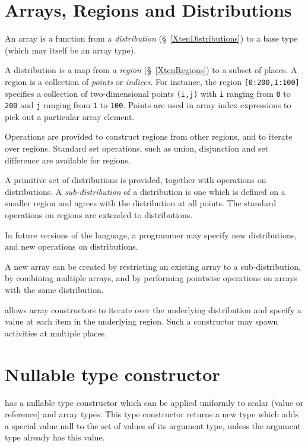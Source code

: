 \section{Arrays, Regions and Distributions}
An \Xten{} array is a function from a {\em distribution}
(\S~\ref{XtenDistributions}) to a base type (which may itself be an
array type).

A distribution is a map from a {\em region} (\S~\ref{XtenRegions}) to a
subset of places.  A region is a collection of {\em points} or
{\em indices}. For instance, the region {\tt [0:200,1:100]} specifies
a collection of two-dimensional points {\tt (i,j)} with 
{\tt i} ranging from {\tt 0} to {\tt 200} and {\tt j} ranging
from {\tt 1} to {\tt 100}. Points are used in array index expressions
to pick out a particular array element.

Operations are provided to construct regions from other regions, and
to iterate over regions. Standard set operations, such as union,
disjunction and set difference are available for regions.

A primitive set of distributions is provided, together with operations
on distributions. A {\em sub-distribution} of a distribution is one
which is defined on a smaller region and agrees with the distribution
at all points.  The standard operations on regions are extended to
distributions.

In future versions of the language, a programmer may specify new
distributions, and new operations on distributions.

A new array can be created by restricting an existing array to a
sub-distribution, by combining multiple arrays, and by performing
pointwise operations on arrays with the same distribution.

\Xten{} allows array constructors to iterate over the underlying
distribution and specify a value at each item in the underlying
region. Such a constructor may spawn activities at multiple places.


\section{Nullable type constructor}

\Xten{} has a {\cf nullable} type constructor which can be applied uniformly to
scalar (value or reference) and array types. This type constructor
returns a new type which adds a special value {\cf null} to the set of
values of its argument type, unless the argument type already has this
value.

